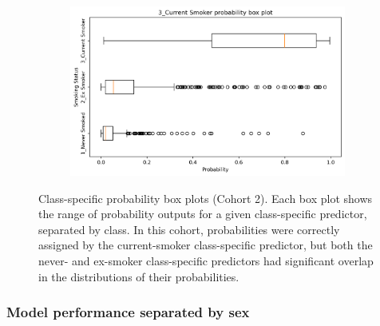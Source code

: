 \documentclass{article} %
\begin{document}
\begin{figure}[p]
\begin{subfigure}{0.75\linewidth}
    \end{subfigure}
    \begin{subfigure}{0.75\linewidth}
        \centering
        \includegraphics[width=\linewidth]{cohort2/test_boxplot_3.png}
    \end{subfigure}
    \caption[Class-specific probability box plots (Cohort 2)]{Class-specific probability box plots (Cohort 2). Each box plot shows the range of probability outputs for a given class-specific predictor, separated by class. In this cohort, probabilities were correctly assigned by the current-smoker class-specific predictor, but both the never- and ex-smoker class-specific predictors had significant overlap in the distributions of their probabilities.}
    \label{fig:cohort2-boxplots}
\end{figure}

\newpage
\subsubsection{Model performance separated by sex}
\end{document}
